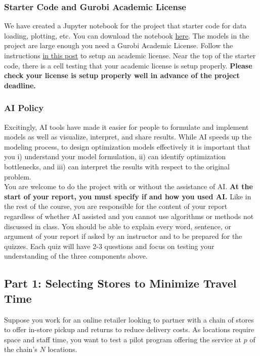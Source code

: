 \documentclass{article}
\begin{document}
\subsubsection*{Starter Code and Gurobi Academic License}
We have created a Jupyter notebook for the project that starter code for data loading, plotting, etc. You can download the notebook \href{https://canvas.cornell.edu/courses/88614/files/folder/project?preview=16397642}{here}. The models in the project are large enough you need a Gurobi Academic License. Follow the instructions \href{https://canvas.cornell.edu/courses/88614/discussion_topics/1102292}{in this post} to setup an academic license. Near the top of the starter code, there is a cell testing that your academic license is setup properly. \textbf{Please check your license is setup properly well in advance of the project deadline.}

\subsubsection*{AI Policy}

Excitingly, AI tools have made it easier for people to formulate and implement models as well as visualize, interpret, and share results. While AI speeds up the modeling process, to design optimization models effectively it is important that you i) understand your model formulation, ii) can identify optimization bottlenecks, and iii) can interpret the results with respect to the original problem.\\

You are welcome to do the project with or without the assistance of AI. \textbf{At the start of your report, you must specify if and how you used AI.} Like in the rest of the course, you are responsible for the content of your report regardless of whether AI assisted and you cannot use algorithms or methods not discussed in class. You should be able to explain every word, sentence, or argument of your report if asked by an instructor and to be prepared for the quizzes. Each quiz will have 2-3 questions and focus on testing your understanding of the three components above. 

\newpage


\subsection*{Part 1: Selecting Stores to Minimize Travel Time} 

Suppose you work for an online retailer looking to partner with a chain of stores to offer in-store pickup and returns to reduce delivery costs. As locations require space and staff time, you want to test a pilot program offering the service at $p$ of the chain's $N$ locations.  \\
\end{document}
